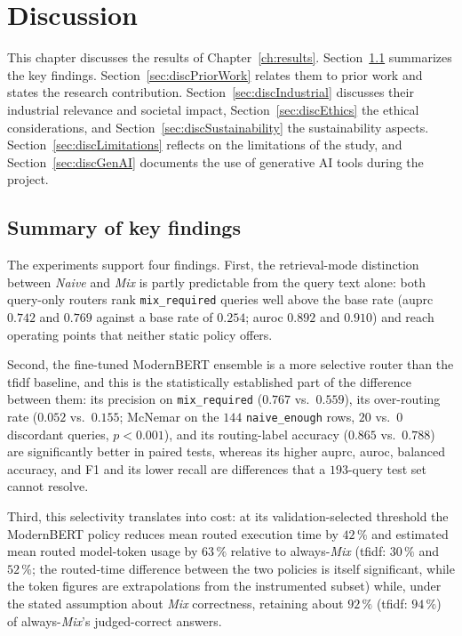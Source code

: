 \documentclass[english, bibtex]{kththesis}               %
\numberwithin{listing}{chapter}
\begin{document}
\cleardoublepage
\chapter{Discussion}
\label{ch:discussion}

This chapter discusses the results of Chapter~\ref{ch:results}. Section~\ref{sec:discKeyFindings} summarizes the key findings. Section~\ref{sec:discPriorWork} relates them to prior work and states the research contribution. Section~\ref{sec:discIndustrial} discusses their industrial relevance and societal impact, Section~\ref{sec:discEthics} the ethical considerations, and Section~\ref{sec:discSustainability} the sustainability aspects. Section~\ref{sec:discLimitations} reflects on the limitations of the study, and Section~\ref{sec:discGenAI} documents the use of generative AI tools during the project.

\section{Summary of key findings}
\label{sec:discKeyFindings}

The experiments support four findings. First, the retrieval-mode distinction between \emph{Naive} and \emph{Mix} is partly predictable from the query text alone: both query-only routers rank \texttt{mix\_required} queries well above the base rate (\gls{auprc} $0.742$ and $0.769$ against a base rate of $0.254$; \gls{auroc} $0.892$ and $0.910$) and reach operating points that neither static policy offers.

Second, the fine-tuned ModernBERT ensemble is a more selective router than the \gls{tfidf} baseline, and this is the statistically established part of the difference between them: its precision on \texttt{mix\_required} ($0.767$ vs.\ $0.559$), its over-routing rate ($0.052$ vs.\ $0.155$; McNemar on the $144$ \texttt{naive\_enough} rows, $20$ vs.\ $0$ discordant queries, $p < 0.001$), and its routing-label accuracy ($0.865$ vs.\ $0.788$) are significantly better in paired tests, whereas its higher \gls{auprc}, \gls{auroc}, balanced accuracy, and F1 and its lower recall are differences that a $193$-query test set cannot resolve.

Third, this selectivity translates into cost: at its validation-selected threshold the ModernBERT policy reduces mean routed execution time by $42\,\%$ and estimated mean routed model-token usage by $63\,\%$ relative to always-\emph{Mix} (\gls{tfidf}: $30\,\%$ and $52\,\%$; the routed-time difference between the two policies is itself significant, while the token figures are extrapolations from the instrumented subset) while, under the stated assumption about \emph{Mix} correctness, retaining about $92\,\%$ (\gls{tfidf}: $94\,\%$) of always-\emph{Mix}'s judged-correct answers.
\end{document}
